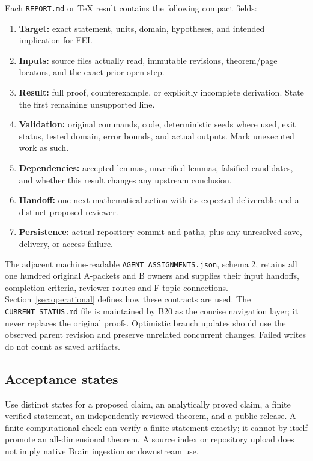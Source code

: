 \documentclass[11pt]{article}
\begin{document}
Each \texttt{REPORT.md} or TeX result contains the following compact fields:
\begin{enumerate}
\item \textbf{Target:} exact statement, units, domain, hypotheses, and intended implication for FEI.
\item \textbf{Inputs:} source files actually read, immutable revisions, theorem/page locators, and the exact prior open step.
\item \textbf{Result:} full proof, counterexample, or explicitly incomplete derivation. State the first remaining unsupported line.
\item \textbf{Validation:} original commands, code, deterministic seeds where used, exit status, tested domain, error bounds, and actual outputs. Mark unexecuted work as such.
\item \textbf{Dependencies:} accepted lemmas, unverified lemmas, falsified candidates, and whether this result changes any upstream conclusion.
\item \textbf{Handoff:} one next mathematical action with its expected deliverable and a distinct proposed reviewer.
\item \textbf{Persistence:} actual repository commit and paths, plus any unresolved save, delivery, or access failure.
\end{enumerate}

The adjacent machine-readable \texttt{AGENT\_ASSIGNMENTS.json}, schema 2, retains all one hundred original A-packets and B owners and supplies their input handoffs, completion criteria, reviewer routes and F-topic connections. Section~\ref{sec:operational} defines how these contracts are used. The \texttt{CURRENT\_STATUS.md} file is maintained by B20 as the concise navigation layer; it never replaces the original proofs. Optimistic branch updates should use the observed parent revision and preserve unrelated concurrent changes. Failed writes do not count as saved artifacts.

\subsection{Acceptance states}

Use distinct states for a proposed claim, an analytically proved claim, a finite verified statement, an independently reviewed theorem, and a public release. A finite computational check can verify a finite statement exactly; it cannot by itself promote an all-dimensional theorem. A source index or repository upload does not imply native Brain ingestion or downstream use.
\end{document}
